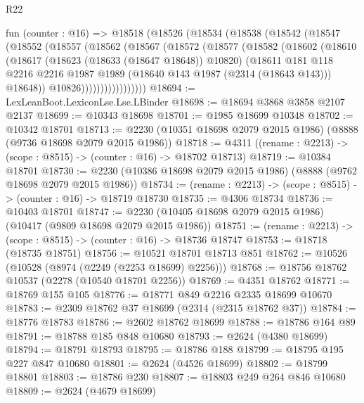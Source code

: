 \begin{lexlean}{R22}
\begin{coremodule}
        fun (counter : @16) =>
        @18518
          (@18526
            (@18534
              (@18538
                (@18542
                  (@18547
                    (@18552
                      (@18557
                        (@18562
                          (@18567
                            (@18572
                              (@18577
                                (@18582
                                  (@18602
                                    (@18610
                                      (@18617
                                        (@18623 (@18633 (@18647 @18648)) @10820)
                                        (@18611
                                          @181
                                          @118
                                          @2216
                                          @2216
                                          @1987
                                          @1989
                                          (@18640 @143 @1987 (@2314 (@18643 @143)))
                                          @18648))
                                      @10826)))))))))))))))))
@18694 := LexLeanBoot.LexiconLse.Lse.LBinder
@18698 := @18694 @3868 @3858 @2107 @2137
@18699 := @10343 @18698
@18701 := @1985 @18699 @10348
@18702 := @10342 @18701
@18713 := @2230 (@10351 @18698 @2079 @2015 @1986) (@8888 (@9736 @18698 @2079 @2015 @1986))
@18718 := @4311 ((rename : @2213) -> (scope : @8515) -> (counter : @16) -> @18702 @18713)
@18719 := @10384 @18701
@18730 := @2230 (@10386 @18698 @2079 @2015 @1986) (@8888 (@9762 @18698 @2079 @2015 @1986))
@18734 := (rename : @2213) -> (scope : @8515) -> (counter : @16) -> @18719 @18730
@18735 := @4306 @18734
@18736 := @10403 @18701
@18747 := @2230 (@10405 @18698 @2079 @2015 @1986) (@10417 (@9809 @18698 @2079 @2015 @1986))
@18751 := (rename : @2213) -> (scope : @8515) -> (counter : @16) -> @18736 @18747
@18753 := @18718 (@18735 @18751)
@18756 := @10521 @18701 @18713 @851
@18762 := @10526 (@10528 (@8974 (@2249 (@2253 @18699) @2256)))
@18768 := @18756 @18762 @10537 (@2278 (@10540 @18701 @2256))
@18769 := @4351 @18762
@18771 := @18769 @155 @105
@18776 := @18771 @849 @2216 @2335 @18699 @10670
@18783 := @2309 @18762 @37 @18699 (@2314 (@2315 @18762 @37))
@18784 := @18776 @18783
@18786 := @2602 @18762 @18699
@18788 := @18786 @164 @89
@18791 := @18788 @185 @848 @10680
@18793 := @2624 (@4380 @18699)
@18794 := @18791 @18793
@18795 := @18786 @188
@18799 := @18795 @195 @227 @847 @10680
@18801 := @2624 (@4526 @18699)
@18802 := @18799 @18801
@18803 := @18786 @230
@18807 := @18803 @249 @264 @846 @10680
@18809 := @2624 (@4679 @18699)

\end{coremodule}
\end{lexlean}

